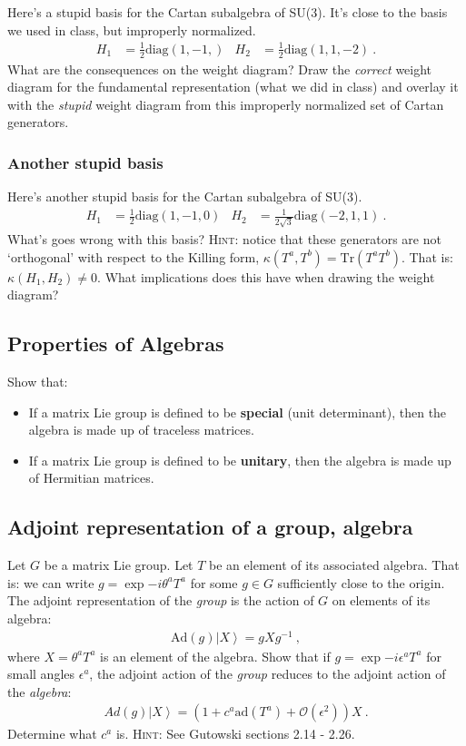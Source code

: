 \documentclass[12pt]{article}
\numberwithin{equation}{subsection}    %
\newcommand{\ket}[1]{\left|#1\right\rangle}    %
\begin{document}
Here's a stupid basis for the Cartan subalgebra of SU(3). It's close to the basis we used in class, but improperly normalized.
\begin{align}
  H_1 &= \frac{1}{2}\text{diag}(1, -1,)
  &
  H_2 &= \frac{1}{2}\text{diag}(1, 1, -2) \ .
\end{align}
What are the consequences on the weight diagram? Draw the \emph{correct} weight diagram for the fundamental representation (what we did in class) and overlay it with the \emph{stupid} weight diagram from this improperly normalized set of Cartan generators.

\subsubsection{Another stupid basis}

Here's another stupid basis for the Cartan subalgebra of SU(3).
\begin{align}
  H_1 &= \frac{1}{2}\text{diag}(1,-1, 0)
  &
  H_2 &= \frac{1}{2\sqrt{3}}\text{diag}(-2, 1, 1) \ .
\end{align}
What's goes wrong with this basis? \textsc{Hint}: notice that these generators are not `orthogonal' with respect to the Killing form, $\kappa(T^a, T^b) = \text{Tr}(T^aT^b)$. That is: $\kappa(H_1, H_2) \neq 0$. What implications does this have when drawing the weight diagram?


\subsection{Properties of Algebras}

Show that:
\begin{itemize}
  \item If a matrix Lie group is defined to be \textbf{special} (unit determinant), then the algebra is made up of traceless matrices.
  \item If a matrix Lie group is defined to be \textbf{unitary}, then the algebra is made up of Hermitian matrices.
\end{itemize}

\subsection{Adjoint representation of a group, algebra}

Let $G$ be a matrix Lie group. Let $T$ be an element of its associated algebra. That is: we can write $g = \exp{-i\theta^a T^a}$ for some $g\in G$ sufficiently close to the origin. The adjoint representation of the \emph{group} is the action of $G$ on elements of its algebra:
\begin{align}
  \text{Ad}(g) \ket{X} = g X g^{-1} \ ,
\end{align}
where $X = \theta^a T^a$ is an element of the algebra.
Show that if $g = \exp{-i\epsilon^a T^a}$ for small angles $\epsilon^a$, the adjoint action of the \emph{group} reduces to the adjoint action of the \emph{algebra}:
\begin{align}
  Ad(g) \ket{X} = \left(1 + c^a \text{ad}(T^a) + \mathcal O(\epsilon^2) \right) X \ .
\end{align}
Determine what $c^a$ is.
%
\textsc{Hint}: See Gutowski sections 2.14 - 2.26.
\end{document}
